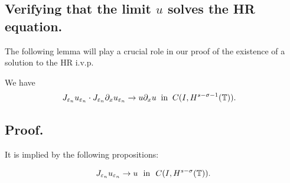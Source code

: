 		\subsection{ Verifying that the limit $u$ solves the HR equation.} 
		The following lemma will play a crucial role in our proof of the
		existence of a solution to the HR i.v.p.
		\begin{lemma}
			\label{lem:cc}
			We have
			\begin{equation}
				\begin{split}
					\label{burgers_and_nonlocal_conv}
				&  J_{\varepsilon_n} u_{\varepsilon_n} 
				\cdot J_{\varepsilon_n} \partial_x u_{\varepsilon_n} 
				\to  u \partial_x u \; \; 
				\text{in} \; \;
				C(I, H^{s-\sigma-1}(\mathbb{T})). 
			\end{split}
			\end{equation}
		\end{lemma}
		\subsection{ Proof.} It is implied by the following propositions:
		\begin{proposition}
			\label{prop:1aa}
			\begin{equation}
				\begin{split}
					 J_{\varepsilon_n} u_{\varepsilon_n} \to  u \ \ \text{in} \ \
					C(I, H^{s-\sigma}(\mathbb{T})).
					\label{}
				\end{split}
			\end{equation}
		\end{proposition}
